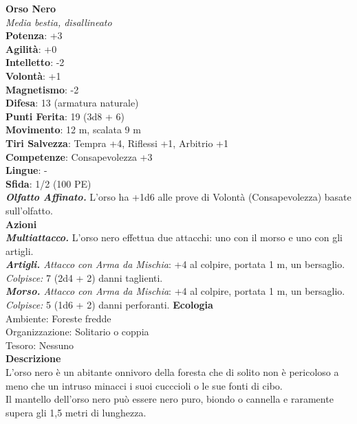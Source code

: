 \begin{multicols}{2}
\medskip\textbf{Orso Nero}\\
\emph{Media bestia, disallineato}\\
\textbf{Potenza}: +3\\
\textbf{Agilità}: +0\\
\textbf{Intelletto}: -2\\
\textbf{Volontà}: +1\\
\textbf{Magnetismo}: -2\\
\textbf{Difesa}: 13 (armatura naturale)\\
\textbf{Punti Ferita}: 19 (3d8 + 6)\\
\textbf{Movimento}: 12 m, scalata 9 m\\
\textbf{Tiri Salvezza}: Tempra +4, Riflessi +1, Arbitrio +1 \\
\textbf{Competenze}: Consapevolezza +3\\
\textbf{Lingue}: -\\
\textbf{Sfida}: 1/2 (100 PE)\smallskip\\
\emph{\textbf{Olfatto Affinato.}} L'orso ha +1d6 alle prove di Volontà (Consapevolezza) basate sull'olfatto.\\
\smallskip\textbf{Azioni}\\
\emph{\textbf{Multiattacco.}} L'orso nero effettua due attacchi: uno con il morso e uno con gli artigli.\\
\emph{\textbf{Artigli.} Attacco con Arma da Mischia}: +4 al colpire, portata 1 m, un bersaglio.\\
\emph{Colpisce:} 7 (2d4 + 2) danni taglienti.\\
\emph{\textbf{Morso.} Attacco con Arma da Mischia}: +4 al colpire, portata 1 m, un bersaglio.\\
\emph{Colpisce:} 5 (1d6 + 2) danni perforanti.
\textbf{Ecologia}\\
Ambiente: Foreste fredde\\
Organizzazione: Solitario o coppia\\
Tesoro: Nessuno\\
\textbf{Descrizione}\\
L'orso nero è un abitante onnivoro della foresta che di solito non è pericoloso a meno che un intruso minacci i suoi cucccioli o le sue fonti di cibo.\\
Il mantello dell'orso nero può essere nero puro, biondo o cannella e raramente supera gli 1,5 metri di lunghezza. \\



\end{multicols}
